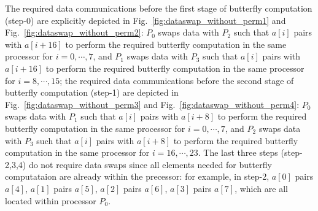 \documentclass{iacrtrans}
\theoremstyle{plain}
\begin{document}
The required data communications before the first stage of butterfly computation (step-0) are explicitly depicted in Fig.~\ref{fig:dataswap_without_perm1} and Fig.~\ref{fig:dataswap_without_perm2}:  $P_0$ swaps data with $P_2$ such that $a[i]$ pairs with $a[i+16]$ to perform the required butterfly computation in the same processor for $i=0,\cdots,7$, and $P_1$ swaps data with $P_3$ such that $a[i]$ pairs with $a[i+16]$ to perform the required butterfly computation in the same processor for $i=8,\cdots,15$; the required data communications before the second stage of butterfly computation (step-1) are depicted in Fig.~\ref{fig:dataswap_without_perm3} and Fig.~\ref{fig:dataswap_without_perm4}: $P_0$ swaps data with $P_1$ such that $a[i]$ pairs with $a[i+8]$ to perform the required butterfly computation in the same processor for $i=0,\cdots,7$, and $P_2$ swaps data with $P_3$ such that $a[i]$ pairs with $a[i+8]$ to perform the required butterfly computation in the same processor for $i=16,\cdots,23$. The last three steps (step-2,3,4) do not require data swaps since all elements needed for butterfly computataion are already within the precessor: for example, in step-2, $a[0]$ pairs $a[4]$, $a[1]$ pairs $a[5]$, $a[2]$ pairs $a[6]$, $a[3]$ pairs $a[7]$, which are all located within processor $P_0$. 
\end{document}

